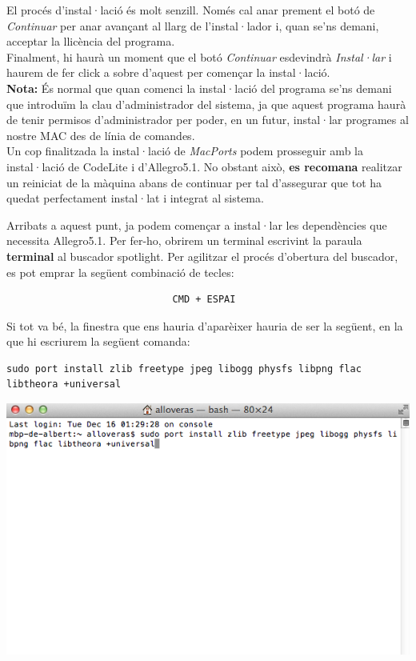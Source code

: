 \documentclass[11pt]{article}
\begin{document}
\noindent El procés d'instal·lació és molt senzill. Només cal anar prement el botó de \textit{Continuar} per anar avançant al llarg de l'instal·lador i, quan se'ns demani, acceptar la llicència del programa.\\

\noindent Finalment, hi haurà un moment que el botó \textit{Continuar} esdevindrà \textit{Instal·lar} i haurem de fer click a sobre d'aquest per començar la instal·lació.\\

\noindent \textbf{Nota:} És normal que quan comenci la instal·lació del programa se'ns demani que introduïm la clau d'administrador del sistema, ja que aquest programa haurà de tenir permisos d'administrador per poder, en un futur, instal·lar programes al nostre MAC des de línia de comandes.\\

\noindent Un cop finalitzada la instal·lació de \textit{MacPorts} podem prosseguir amb la instal·lació de CodeLite i d'Allegro5.1. No obstant això, \textbf{es recomana }realitzar un reiniciat de la màquina abans de continuar per tal d'assegurar que tot ha quedat perfectament instal·lat i integrat al sistema.


\newpage

\noindent Arribats a aquest punt, ja podem començar a instal·lar les dependències que necessita Allegro5.1. Per fer-ho, obrirem un terminal escrivint la paraula \textbf{terminal} al buscador spotlight. Per agilitzar el procés d'obertura del buscador, es pot emprar la següent combinació de tecles:

\begin{verbatim}
	                         CMD + ESPAI
\end{verbatim}

\noindent Si tot va bé, la finestra que ens hauria d'aparèixer hauria de ser la següent, en la que hi escriurem la següent comanda:

\begin{verbatim}
sudo port install zlib freetype jpeg libogg physfs libpng flac
libtheora +universal
\end{verbatim}

\begin{center}
	\includegraphics[scale=0.5]{img/Ports_Install_Libs.png}
\end{center}
\end{document}
